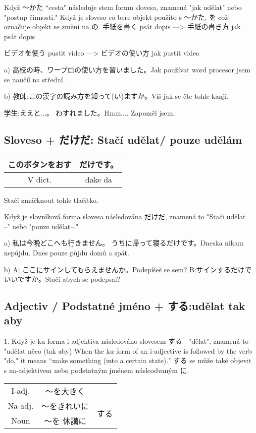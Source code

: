 Když 〜かた “cesta" následuje stem formu slovesa, znamená "jak udělat" nebo "postup činnosti." Když je sloveso co bere objekt použito s  〜かた, を což označuje objekt se změní na の.
手紙を書く psát dopis ––> 手紙の書き方 jak psát dopis

ビデオを使う pustit video ––> ビデオの使い方 jak pustit video


a) 高校の時、ワープロの使い方を習いました。Jak používat word procesor jsem se naučil na střední.

b) 教師:この漢字の読み方を知って(い)ますか。Víš jak se čte tohle kanji.

 学生:ええと...。 わすれました。Hmm.... Zapoměl jsem.

\subsection{ Sloveso + だけだ: Stačí udělat/ pouze udělám ~}
\begin{tabular}{|c|c|}
\hline
このボタンをおす &だけです。\\
\hline
V dict. &dake da\\
\hline
\end{tabular}
Stačí zmáčknout tohle tlačítko.


Když je slovníková forma slovesa následována だけだ, znamená to "Stači udělat --" nebo "pouze udělat--."

a) 私は今晩どこへも行きません。 うちに帰って寝るだけです。Dneska nikam nepůjdu. Dnes pouze půjdu domů a spát.

b) A: ここにサインしてもらえませんか。Podepíšeš se sem?
 B:サインするだけでいいですか。Stačí abych se podepsal?
 
 
\subsection{Adjectiv / Podstatné jméno + する:udělat tak aby}

1. Když je ku-forma i-adjektiva následováno slovesem する　"dělat", znamená to "udělat něco (tak aby) When the ku-form of an i-adjective is followed by the verb "do," it means “make
something (into a certain state)."  する  se může také objevit s na-adjektivem nebo podstatným jménem násleodvaným  に.
\begin{tabular}{|c|c|c|}
\hline
I-adj.&〜を大きく&\\

Na-adj.&〜をきれいに&\multirow{3}{*}{する}\\

Noun&〜を 休講に&\\
\hline
\end{tabular}


